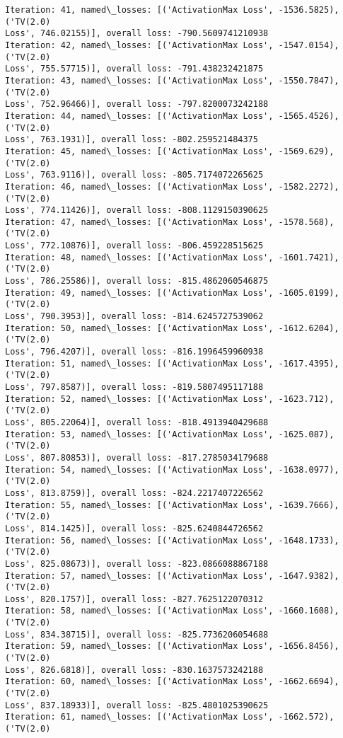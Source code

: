 \documentclass[10pt]{article}
\begin{document}
\begin{Verbatim}[commandchars=\\\{\}]
Iteration: 41, named\_losses: [('ActivationMax Loss', -1536.5825), ('TV(2.0)
Loss', 746.02155)], overall loss: -790.5609741210938
Iteration: 42, named\_losses: [('ActivationMax Loss', -1547.0154), ('TV(2.0)
Loss', 755.57715)], overall loss: -791.438232421875
Iteration: 43, named\_losses: [('ActivationMax Loss', -1550.7847), ('TV(2.0)
Loss', 752.96466)], overall loss: -797.8200073242188
Iteration: 44, named\_losses: [('ActivationMax Loss', -1565.4526), ('TV(2.0)
Loss', 763.1931)], overall loss: -802.259521484375
Iteration: 45, named\_losses: [('ActivationMax Loss', -1569.629), ('TV(2.0)
Loss', 763.9116)], overall loss: -805.7174072265625
Iteration: 46, named\_losses: [('ActivationMax Loss', -1582.2272), ('TV(2.0)
Loss', 774.11426)], overall loss: -808.1129150390625
Iteration: 47, named\_losses: [('ActivationMax Loss', -1578.568), ('TV(2.0)
Loss', 772.10876)], overall loss: -806.459228515625
Iteration: 48, named\_losses: [('ActivationMax Loss', -1601.7421), ('TV(2.0)
Loss', 786.25586)], overall loss: -815.4862060546875
Iteration: 49, named\_losses: [('ActivationMax Loss', -1605.0199), ('TV(2.0)
Loss', 790.3953)], overall loss: -814.6245727539062
Iteration: 50, named\_losses: [('ActivationMax Loss', -1612.6204), ('TV(2.0)
Loss', 796.4207)], overall loss: -816.1996459960938
Iteration: 51, named\_losses: [('ActivationMax Loss', -1617.4395), ('TV(2.0)
Loss', 797.8587)], overall loss: -819.5807495117188
Iteration: 52, named\_losses: [('ActivationMax Loss', -1623.712), ('TV(2.0)
Loss', 805.22064)], overall loss: -818.4913940429688
Iteration: 53, named\_losses: [('ActivationMax Loss', -1625.087), ('TV(2.0)
Loss', 807.80853)], overall loss: -817.2785034179688
Iteration: 54, named\_losses: [('ActivationMax Loss', -1638.0977), ('TV(2.0)
Loss', 813.8759)], overall loss: -824.2217407226562
Iteration: 55, named\_losses: [('ActivationMax Loss', -1639.7666), ('TV(2.0)
Loss', 814.1425)], overall loss: -825.6240844726562
Iteration: 56, named\_losses: [('ActivationMax Loss', -1648.1733), ('TV(2.0)
Loss', 825.08673)], overall loss: -823.0866088867188
Iteration: 57, named\_losses: [('ActivationMax Loss', -1647.9382), ('TV(2.0)
Loss', 820.1757)], overall loss: -827.7625122070312
Iteration: 58, named\_losses: [('ActivationMax Loss', -1660.1608), ('TV(2.0)
Loss', 834.38715)], overall loss: -825.7736206054688
Iteration: 59, named\_losses: [('ActivationMax Loss', -1656.8456), ('TV(2.0)
Loss', 826.6818)], overall loss: -830.1637573242188
Iteration: 60, named\_losses: [('ActivationMax Loss', -1662.6694), ('TV(2.0)
Loss', 837.18933)], overall loss: -825.4801025390625
Iteration: 61, named\_losses: [('ActivationMax Loss', -1662.572), ('TV(2.0)

\end{Verbatim}
\end{document}
